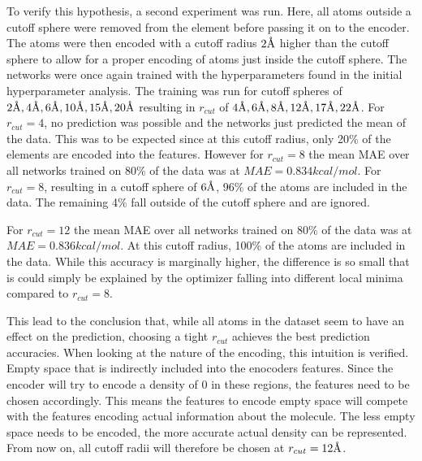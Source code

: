 To verify this hypothesis, a second experiment was run.
Here, all atoms outside a cutoff sphere were removed from the element before passing it on to the encoder.
The atoms were then encoded with a cutoff radius $2 \AA$ higher than the cutoff sphere to allow for a proper 
encoding of atoms just inside the cutoff sphere.
The networks were once again trained with the hyperparameters found in the initial hyperparameter analysis.
The training was run for cutoff spheres of $2\AA, 4\AA, 6\AA, 10\AA, 15\AA, 20\AA$ resulting in $r_{cut}$ 
of $4\AA, 6\AA, 8\AA, 12\AA, 17\AA, 22\AA$.
For $r_{cut}=4$, no prediction was possible and the networks just predicted the mean of the data.
This was to be expected since at this cutoff radius, only 20\% of the elements are encoded into the features.
However for $r_{cut}=8$ the mean MAE over all networks trained on 80\% of the data was at $MAE = 0.834 kcal/mol$. 
For $r_{cut} = 8$, resulting in a cutoff sphere of $6 \AA$, 96\% of the atoms are included in the data. 
The remaining 4\% fall outside of the cutoff sphere and are ignored. 

For $r_{cut}=12$ the mean MAE over all networks trained on 80\% of the data was at $MAE = 0.836 kcal/mol$. 
At this cutoff radius, 100\% of the atoms are included in the data.
While this accuracy is marginally higher, the difference is so small that is could 
simply be explained by the optimizer falling into different local minima compared to $r_{cut}=8$. 

This lead to the conclusion that, while all atoms in the dataset seem to have an effect on the prediction,
choosing a tight $r_{cut}$ achieves the best prediction accuracies.
When looking at the nature of the encoding, this intuition is verified.
Empty space that is indirectly included into the enocoders features.
Since the encoder will try to encode a density of 0 in these regions,
the features need to be chosen accordingly.
This means the features to encode empty space will compete with the features encoding
actual information about the molecule.
The less empty space needs to be encoded, the more accurate actual density can be represented.
From now on, all cutoff radii will therefore be chosen at $r_{cut} = 12 \AA$.

